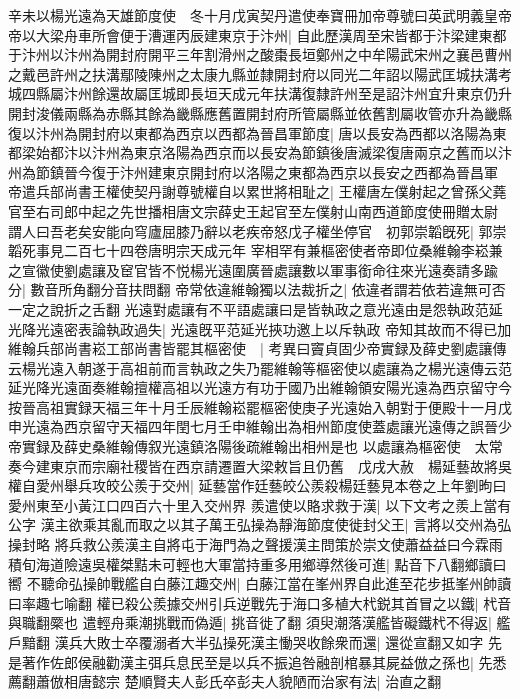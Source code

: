 辛未以楊光遠為天雄節度使　冬十月戊寅契丹遣使奉寶冊加帝尊號曰英武明義皇帝　帝以大梁舟車所會便于漕運丙辰建東京于汴州|{
	自此歷漢周至宋皆都于汴梁建東都于汴州以汴州為開封府開平三年割滑州之酸棗長垣鄭州之中牟陽武宋州之襄邑曹州之戴邑許州之扶溝鄢陵陳州之太康九縣並隸開封府以同光二年詔以陽武匡城扶溝考城四縣屬汴州餘還故屬匡城即長垣天成元年扶溝復隸許州至是詔汴州宜升東京仍升開封浚儀兩縣為赤縣其餘為畿縣應舊置開封府所管屬縣並依舊割屬收管亦升為畿縣}
復以汴州為開封府以東都為西京以西都為晉昌軍節度|{
	唐以長安為西都以洛陽為東都梁始都汴以汴州為東京洛陽為西京而以長安為節鎮後唐滅梁復唐兩京之舊而以汴州為節鎮晉今復于汴州建東京開封府以洛陽之東都為西京以長安之西都為晉昌軍}
帝遣兵部尚書王權使契丹謝尊號權自以累世將相耻之|{
	王權唐左僕射起之曾孫父蕘官至右司郎中起之先世播相唐文宗薛史王起官至左僕射山南西道節度使冊贈太尉}
謂人曰吾老矣安能向穹廬屈膝乃辭以老疾帝怒戊子權坐停官　初郭崇韜旣死|{
	郭崇韜死事見二百七十四卷唐明宗天成元年}
宰相罕有兼樞密使者帝即位桑維翰李崧兼之宣徽使劉處讓及䆠官皆不悦楊光遠圍廣晉處讓數以軍事銜命往來光遠奏請多踰分|{
	數音所角翻分音扶問翻}
帝常依違維翰獨以法裁折之|{
	依違者謂若依若違無可否一定之說折之舌翻}
光遠對處讓有不平語處讓曰是皆執政之意光遠由是怨執政范延光降光遠密表論執政過失|{
	光遠旣平范延光挾功邀上以斥執政}
帝知其故而不得已加維翰兵部尚書崧工部尚書皆罷其樞密使　|{
	考異曰竇貞固少帝實録及薛史劉處讓傳云楊光遠入朝遂于高祖前而言執政之失乃罷維翰等樞密使以處讓為之楊光遠傳云范延光降光遠面奏維翰擅權高祖以光遠方有功于國乃出維翰領安陽光遠為西京留守今按晉高祖實録天福三年十月壬辰維翰崧罷樞密使庚子光遠始入朝對于便殿十一月戊申光遠為西京留守天福四年閏七月壬申維翰出為相州節度使蓋處讓光遠傳之誤晉少帝實録及薛史桑維翰傳叙光遠鎮洛陽後疏維翰出相州是也}
以處讓為樞密使　太常奏今建東京而宗廟社稷皆在西京請遷置大梁敕旨且仍舊　戊戌大赦　楊延藝故將吳權自愛州舉兵攻皎公羨于交州|{
	延藝當作廷藝皎公羨殺楊廷藝見本卷之上年劉昫曰愛州東至小黃江口四百六十里入交州界}
羨遣使以賂求救于漢|{
	以下文考之羨上當有公字}
漢主欲乘其亂而取之以其子萬王弘操為靜海節度使徙封父王|{
	言將以交州為弘操封略}
將兵救公羨漢主自將屯于海門為之聲援漢主問策於崇文使蕭益益曰今霖雨積旬海道險遠吳權桀黠未可輕也大軍當持重多用鄉導然後可進|{
	點音下八翻鄉讀曰嚮}
不聽命弘操帥戰艦自白藤江趣交州|{
	白藤江當在峯州界自此進至花步抵峯州帥讀曰率趣七喻翻}
權已殺公羨據交州引兵逆戰先于海口多植大杙鋭其首冒之以鐵|{
	杙音與職翻橜也}
遣輕舟乘潮挑戰而偽遁|{
	挑音徙了翻}
須臾潮落漢艦皆礙鐵杙不得返|{
	艦戶黯翻}
漢兵大敗士卒覆溺者大半弘操死漢主慟哭收餘衆而還|{
	還從宣翻又如字}
先是著作佐郎侯融勸漢主弭兵息民至是以兵不振追咎融剖棺暴其屍益倣之孫也|{
	先悉薦翻蕭倣相唐懿宗}
楚順賢夫人彭氏卒彭夫人貌陋而治家有法|{
	治直之翻}


